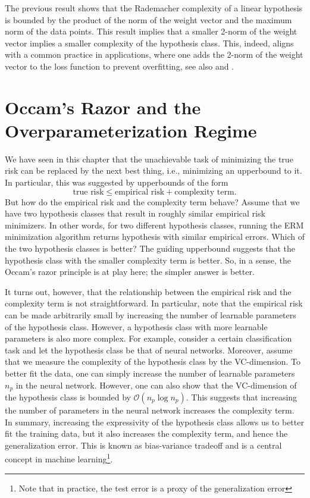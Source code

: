 \begin{rmk}
The previous result shows that the Rademacher complexity of a linear hypothesis
is bounded by the product of the norm of the weight vector and the maximum norm
of the data points. This result implies that a smaller 2-norm of the weight
vector implies a smaller complexity of the hypothesis class. This, indeed,
aligns with a common practice in applications, where one adds the 2-norm of the
weight vector to the loss function to prevent overfitting, see also
 and .
\end{rmk}
\section{Occam's Razor and the Overparameterization Regime}
We have seen in this chapter that the unachievable task of minimizing the true
risk can be replaced by the next best thing, i.e., minimizing an upperbound to
it. In particular, this was suggested by upperbounds of the form
$$
\text{true risk} \leq \text{empirical risk} + \text{complexity term}.
$$
But how do the empirical risk and the complexity term behave? Assume that we
have two hypothesis classes that result in roughly similar empirical risk
minimizers. In other words, for two different hypothesis classes, running the ERM
minimization algorithm returns hypothesis with similar empirical errors. Which
of the two hypothesis classes is better? The guiding upperbound suggests that
the hypothesis class with the smaller complexity term is better. So, in a sense,
the Occam's razor principle is at play here; the simpler answer is better. 

It turns out, however, that the relationship between the empirical risk and the
complexity term is not straightforward. In particular, note that the empirical
risk can be made arbitrarily small by increasing the number of learnable parameters of the
hypothesis class. However, a hypothesis class with more learnable parameters is also more
complex. For example, consider a certain classification task and let the
hypothesis class be that of neural networks. Moreover, assume that we measure
the complexity of the hypothesis class by the VC-dimension. To better fit the
data, one can simply increase the number of learnable parameters $n_p$ in the neural
network. However, one can also show that the VC-dimension of the hypothesis
class is bounded by $\mathcal{O}(n_p \log n_p)$. This suggests that increasing
the number of parameters in the neural network increases the complexity term. In
summary, increasing the expressivity of the hypothesis class allows us to better
fit the training data, but it also increases the complexity term, and hence the
generalization error. This is known as bias-variance tradeoff and is a central
concept in machine learning\footnote{Note that in practice, the test error is a
proxy of the generalization error}.

